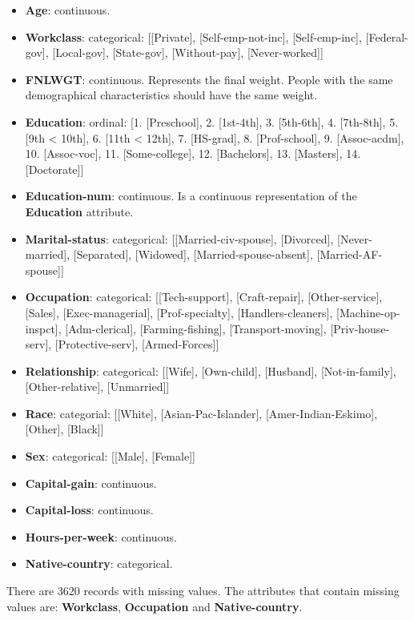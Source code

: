\documentclass[a4paper]{llncs}
\begin{document}
\begin{itemize}
  \item{\textbf{Age}: continuous.}
  \item{\textbf{Workclass}: categorical: [[Private], [Self-emp-not-inc], 
        [Self-emp-inc], [Federal-gov], [Local-gov], [State-gov], [Without-pay], 
        [Never-worked]]}
  \item{\textbf{FNLWGT}: continuous. Represents the final weight. People with 
        the same demographical characteristics should have the same weight.}
  \item{\textbf{Education}: ordinal: [1. [Preschool], 2. [1st-4th], 3. 
        [5th-6th], 4. [7th-8th], 5. [9th < 10th], 6. [11th < 12th], 7. 
        [HS-grad], 8. [Prof-school], 9. [Assoc-acdm], 10. [Assoc-voc], 11.
        [Some-college], 12. [Bachelors], 13. [Masters], 14. [Doctorate]]}
  \item{\textbf{Education-num}: continuous. Is a continuous representation of 
        the \textbf{Education} attribute.}
  \item{\textbf{Marital-status}: categorical: [[Married-civ-spouse], [Divorced],
        [Never-married], [Separated], [Widowed], [Married-spouse-absent],
        [Married-AF-spouse]]}
  \item{\textbf{Occupation}: categorical: [[Tech-support], [Craft-repair],
        [Other-service], [Sales], [Exec-managerial], [Prof-specialty], 
        [Handlers-cleaners], [Machine-op-inspct], [Adm-clerical], 
        [Farming-fishing], [Transport-moving], [Priv-house-serv], 
        [Protective-serv], [Armed-Forces]]}
  \item{\textbf{Relationship}: categorical: [[Wife], [Own-child], [Husband], 
        [Not-in-family], [Other-relative], [Unmarried]]}
  \item{\textbf{Race}: categorial: [[White], [Asian-Pac-Islander], 
        [Amer-Indian-Eskimo], [Other], [Black]]}
  \item{\textbf{Sex}: categorical: [[Male], [Female]]}
  \item{\textbf{Capital-gain}: continuous.}
  \item{\textbf{Capital-loss}: continuous.}
  \item{\textbf{Hours-per-week}: continuous.}
  \item{\textbf{Native-country}: categorical.}
\end{itemize}

There are 3620 records with missing values. The attributes that contain missing values are: \textbf{Workclass}, \textbf{Occupation} and \textbf{Native-country}.
\end{document}

